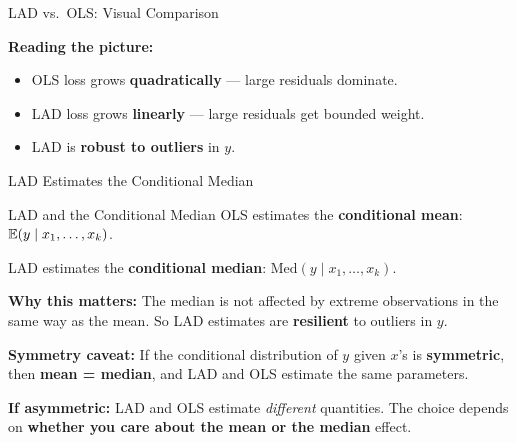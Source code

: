 \documentclass[aspectratio=169, 12pt]{beamer}
\begin{document}
\begin{frame}[shrink=20]{LAD vs.\ OLS: Visual Comparison}

  \begin{center}
  \end{center}

  \begin{highlightbox}
    \textbf{Reading the picture:}
    \begin{itemize}\setlength{\itemsep}{1pt}
      \item OLS loss grows \textbf{quadratically} — large residuals dominate.
      \item LAD loss grows \textbf{linearly} — large residuals get bounded weight.
      \item LAD is \textbf{robust to outliers} in $y$.
    \end{itemize}
  \end{highlightbox}

\end{frame}

\begin{frame}[shrink=10]{LAD Estimates the Conditional Median}

  \begin{definitionbox}{LAD and the Conditional Median}
    OLS estimates the \textbf{conditional mean}: $\operatorname{\mathbb{E}}(y \mid x_1, \ldots, x_k)$.

    \medskip
    LAD estimates the \textbf{conditional median}: $\text{Med}(y \mid x_1, \ldots, x_k)$.
  \end{definitionbox}

  \begin{keybox}
    \textbf{Why this matters:} The median is not affected by extreme observations in the
    same way as the mean. So LAD estimates are \textbf{resilient} to outliers in $y$.
  \end{keybox}

  \begin{highlightbox}
    \textbf{Symmetry caveat:} If the conditional distribution of $y$ given $x$'s is
    \textbf{symmetric}, then \textbf{mean = median}, and LAD and OLS estimate the same
    parameters.

    \medskip
    \textbf{If asymmetric:} LAD and OLS estimate \emph{different} quantities. The choice
    depends on \textbf{whether you care about the mean or the median} effect.
  \end{highlightbox}

\end{frame}
\end{document}
